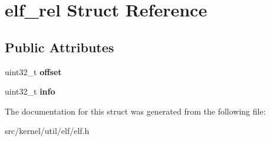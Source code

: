 \hypertarget{structelf__rel}{}\section{elf\+\_\+rel Struct Reference}
\label{structelf__rel}
\subsection*{Public Attributes}
\begin{DoxyCompactItemize}
\item 
\mbox{\label{structelf__rel_a851b6bbc921cd711690e1841ac477c1c}} 
uint32\+\_\+t {\bfseries offset}
\item 
\mbox{\label{structelf__rel_a87d78c0c27491912f9aadb5dbf14c146}} 
uint32\+\_\+t {\bfseries info}
\end{DoxyCompactItemize}


The documentation for this struct was generated from the following file\+:\begin{DoxyCompactItemize}
\item 
src/kernel/util/elf/elf.\+h\end{DoxyCompactItemize}
